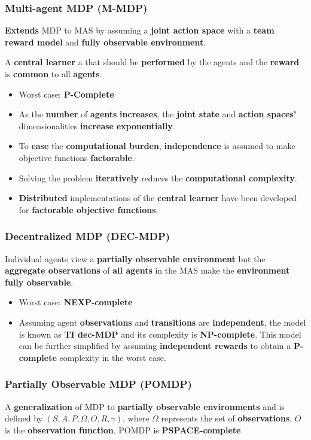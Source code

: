 \documentclass{beamer}
\begin{document}
	\begin{frame}
		\frametitle{Multi-agent MDP (M-MDP)}
		\textbf{Extends} MDP to MAS by assuming a \textbf{joint action space} with a \textbf{team reward model} and \textbf{fully observable environment}. 
		
		\vspace{0.1in}
		A \textbf{central learner} \vspace{0.1in} a \vspace{0.1in} that should be \textbf{performed} by the agents and the \textbf{reward} is \textbf{common} to all \textbf{agents}. 
		\begin{itemize}
			\item Worst case: \textbf{P-Complete}
			\item As the \textbf{number} of \textbf{agents} \textbf{increases}, the \textbf{joint state} and \textbf{action spaces’} dimensionalities \textbf{increase} \textbf{exponentially}.  
			\item 	To \textbf{ease} the \textbf{computational burden}, \textbf{independence} is assumed to make objective functions \textbf{factorable}.
			\item Solving the problem \textbf{iteratively} reduces the \textbf{computational complexity}.
			\item \textbf{Distributed} implementations of the \textbf{central learner} have been developed for \textbf{factorable objective functions}.
		\end{itemize}
	\end{frame}

	\begin{frame}
		\frametitle{Decentralized MDP (DEC-MDP)}
		Individual agents view a \textbf{partially observable environment} but the \textbf{aggregate observations} of \textbf{all agents} in the MAS make the \textbf{environment fully observable}. 
		\begin{itemize}
			\item Worst case: \textbf{NEXP-complete}
			\item Assuming agent \textbf{observations} and \textbf{transitions} are \textbf{independent}, the model is known as \textbf{TI dec-MDP} and its complexity is \textbf{NP-complete}. This model can be further simplified by assuming \textbf{independent rewards} to obtain a \textbf{P-complete} complexity in the worst case.
		\end{itemize}
	\end{frame}

	\begin{frame}
		\frametitle{Partially Observable MDP (POMDP)}
		A \textbf{generalization} of MDP to \textbf{partially observable environments} and is defined by $(S, A, P, \Omega, O, R, \gamma )$, where $\Omega$ represents the set of \textbf{observations}, $O$ is the \textbf{observation function}. POMDP is \textbf{PSPACE-complete}	
	\end{frame}
\end{document}
